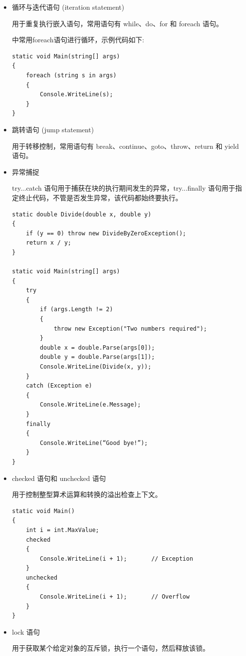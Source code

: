 \begin{itemize}
    \item 循环与迭代语句 (iteration statement)

          用于重复执行嵌入语句，常用语句有 while、do、for 和 foreach 语句。

          \cs 中常用foreach语句进行循环，示例代码如下:

          \begin{lstlisting}
static void Main(string[] args)
{
    foreach (string s in args)
    {
        Console.WriteLine(s);
    }
}
\end{lstlisting}

    \item 跳转语句 (jump statement)

          用于转移控制，常用语句有 break、continue、goto、throw、return 和 yield 语句。

    \item 异常捕捉

          try...catch 语句用于捕获在块的执行期间发生的异常，try...finally 语句用于指定终止代码，不管是否发生异常，该代码都始终要执行。

          \begin{lstlisting}
static double Divide(double x, double y)
{
    if (y == 0) throw new DivideByZeroException();
    return x / y;
}

static void Main(string[] args)
{
    try
    {
        if (args.Length != 2)
        {
            throw new Exception("Two numbers required");
        }
        double x = double.Parse(args[0]);
        double y = double.Parse(args[1]);
        Console.WriteLine(Divide(x, y));
    }
    catch (Exception e)
    {
        Console.WriteLine(e.Message);
    }
    finally
    {
        Console.WriteLine(“Good bye!”);
    }
}
\end{lstlisting}

    \item checked 语句和 unchecked 语句

          用于控制整型算术运算和转换的溢出检查上下文。

          \begin{lstlisting}
static void Main()
{
    int i = int.MaxValue;
    checked
    {
        Console.WriteLine(i + 1);       // Exception
    }
    unchecked
    {
        Console.WriteLine(i + 1);       // Overflow
    }
}
\end{lstlisting}

    \item lock 语句

          用于获取某个给定对象的互斥锁，执行一个语句，然后释放该锁。


\end{itemize}
